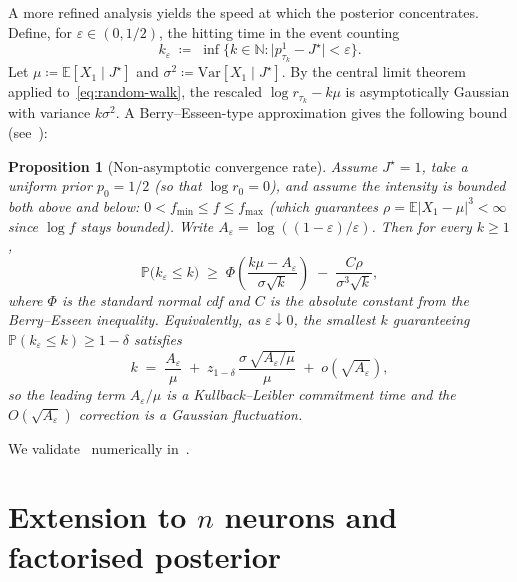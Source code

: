 \documentclass[11pt,a4paper]{article}
\newtheorem{proposition}[theorem]{Proposition}
\theoremstyle{definition}
\newcommand{\N}{\mathbb{N}}
\newcommand{\E}{\mathbb{E}}
\newcommand{\Prob}{\mathbb{P}}
\begin{document}
A more refined analysis yields the speed at which the posterior
concentrates. Define, for $\varepsilon \in (0, 1/2)$, the hitting
time in the event counting
\begin{equation}
    k_\varepsilon \;\coloneqq\; \inf\bigl\{ k \in \N :
        \bigl| p_{\tau_k}^1 - J^\star \bigr| < \varepsilon \bigr\}.
\end{equation}
Let $\mu \coloneqq \E[X_1 \mid J^\star]$ and
$\sigma^2 \coloneqq \mathrm{Var}[X_1 \mid J^\star]$. By the central
limit theorem applied to~\eqref{eq:random-walk}, the rescaled
$\log r_{\tau_k} - k \mu$ is asymptotically Gaussian with variance
$k \sigma^2$. A Berry--Esseen-type approximation gives the following
bound (see~):
\begin{proposition}[Non-asymptotic convergence rate]
\label{prop:rate}
Assume $J^\star = 1$, take a uniform prior $p_0 = 1/2$ (so that $\log r_0 = 0$), and assume the intensity is bounded both above and below: $0 < f_{\min} \leq f \leq f_{\max}$ (which guarantees $\rho = \E|X_1 - \mu|^3 < \infty$ since $\log f$ stays bounded). Write $A_\varepsilon = \log ((1 - \varepsilon) / \varepsilon)$. Then for every $k \geq 1$,
\begin{equation}
    \Prob\bigl( k_\varepsilon \leq k \bigr) \;\geq\;
    \Phi\!\left( \frac{k \mu - A_\varepsilon}{\sigma \sqrt{k}} \right)
    \;-\; \frac{C \rho}{\sigma^3 \sqrt{k}},
\end{equation}
where $\Phi$ is the standard normal cdf and $C$ is the absolute constant from
the Berry--Esseen inequality. Equivalently, as $\varepsilon \downarrow
0$, the smallest $k$ guaranteeing $\Prob(k_\varepsilon \leq k) \geq
1 - \delta$ satisfies
\begin{equation*}
    k \;=\; \frac{A_\varepsilon}{\mu}
    \;+\; z_{1-\delta}\,\frac{\sigma\,\sqrt{A_\varepsilon / \mu}}{\mu}
    \;+\; o\!\left(\sqrt{A_\varepsilon}\right),
\end{equation*}
so the leading term $A_\varepsilon/\mu$ is a Kullback--Leibler
commitment time and the $O(\sqrt{A_\varepsilon})$ correction is a
Gaussian fluctuation.
\end{proposition}
We validate~ numerically in~.

\section{Extension to $n$ neurons and factorised posterior}
\label{sec:nneurons}
\end{document}
